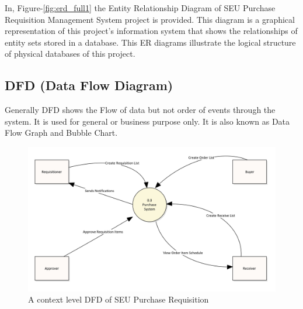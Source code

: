 \documentclass[12pt]{report} %
\begin{document}
In, Figure-\ref{fig:erd_full1} the Entity Relationship Diagram of SEU Purchase Requisition Management System project is provided. This diagram is a graphical representation of this project's information system that shows the relationships of entity sets stored in a database. This ER diagrams illustrate the logical structure of physical databases of this project.









\subsection{DFD (Data Flow Diagram)}
Generally DFD shows the Flow of data but not order of events through the system. It is used for general or business purpose only. It is also known as Data Flow Graph and Bubble Chart.

\begin{figure}[h]
	\includegraphics[width=1\textwidth]{pic/DFD/context_level.png}
	\caption{A context level DFD of SEU Purchase Requisition}
	\label{fig:context_level}
\end{figure}
\clearpage


\end{document}
